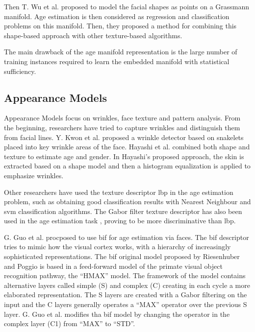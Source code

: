 Then T. Wu et al. \cite{journals/tifs/WuTC12} proposed to model the facial shapes as points on a Grassmann manifold. Age estimation is then considered as regression and classification problems on this manifold. Then, they proposed a method for combining this shape-based approach with other texture-based algorithms.

The main drawback of the age manifold representation is the large number of training instances required to learn the embedded manifold with statistical sufficiency.

\subsection{Appearance Models}\label{subsec:BIF}

Appearance Models focus on wrinkles, face texture and pattern analysis. From the beginning, researchers have tried to capture wrinkles and distinguish them from facial lines. Y. Kwon et al. \cite{Kwon:1999:ACF:311844.311845} proposed a wrinkle detector based on snakelets \cite{Kass88snakes:active} placed into key wrinkle areas of the face. Hayashi et al. \cite{969698} \cite{1195171} \cite{conf/icpr/HayashiYIK02} combined both shape and texture to estimate age and gender. In Hayashi's proposed approach, the skin is extracted based on a shape model and then a histogram equalization is applied to emphasize wrinkles.

Other researchers have used the texture descriptor \gls{lbp} \cite{Ahonen:2006:FDL:1175897.1176245} in the age estimation problem, such as \cite{4717926} \cite{6460367} obtaining good classification results with Nearest Neighbour and \gls{svm} classification algorithms. The Gabor \cite{Liu:2002:GFB:2319007.2320264} filter texture descriptor has also been used in the age estimation task  \cite{Gao:2009:FAC:1567988.1568003}, proving to be more discriminative than \gls{lbp}.

G. Guo et al. \cite{conf/cvpr/GuoMFH09} procposed to use \gls{bif} \cite{Riesenhuber99hierarchicalmodels} for age estimation via faces. The \gls{bif} descriptor tries to mimic how the visual cortex works, with a hierarchy of increasingly sophisticated representations. The \gls{bif} original model proposed by Riesenhuber and Poggio \cite{Riesenhuber99hierarchicalmodels} is based in a feed-forward model of the primate visual object recognition pathway, the ``HMAX'' model. The framework of the model contains alternative layers called simple (S) and complex (C) creating in each cycle a more elaborated representation. The S layers are created with a Gabor filtering on the input and the C layers generally operates a ``MAX'' operator over the previous S layer. G. Guo et al. \cite{conf/cvpr/GuoMFH09} modifies tha \gls{bif} model by changing the operator in the complex layer (C1) from ``MAX'' to ``STD''.

